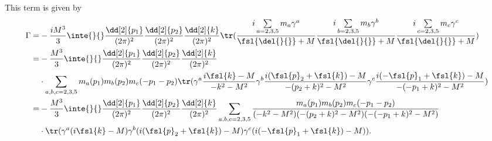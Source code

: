 This term is given by
\begin{align*}
	\Gamma =& -\frac{iM^{3}}{3}\inte{}{}\frac{\dd[2]{p_{1}}}{(2\pi)^{2}}\frac{\dd[2]{p_{2}}}{(2\pi)^{2}}\frac{\dd[2]{k}}{(2\pi)^{2}}\tr(\frac{i\sum\limits_{a = 2, 3, 5}m_{a}\gamma^{a}}{\fsl{\del{}{}} + M}\frac{i\sum\limits_{b = 2, 3, 5}m_{b}\gamma^{b}}{\fsl{\del{}{}} + M}\frac{i\sum\limits_{c = 2, 3, 5}m_{c}\gamma^{c}}{\fsl{\del{}{}} + M}) \\
	       =& -\frac{M^{3}}{3}\inte{}{}\frac{\dd[2]{p_{1}}}{(2\pi)^{2}}\frac{\dd[2]{p_{2}}}{(2\pi)^{2}}\frac{\dd[2]{k}}{(2\pi)^{2}} \\
	        &\cdot\sum\limits_{a, b, c = 2, 3, 5}m_{a}(p_{1})m_{b}(p_{2})m_{c}(-p_{1} - p_{2})\tr(\gamma^{a}\frac{i\fsl{k} - M}{-k^{2} - M^{2}}\gamma^{b}\frac{i(\fsl{p}_{2} + \fsl{k}) - M}{-(p_{2} + k)^{2} - M^{2}}\gamma^{c}\frac{i(-\fsl{p}_{1} + \fsl{k}) - M}{-(-p_{1} + k)^{2} - M^{2}}) \\
	       =& -\frac{M^{3}}{3}\inte{}{}\frac{\dd[2]{p_{1}}}{(2\pi)^{2}}\frac{\dd[2]{p_{2}}}{(2\pi)^{2}}\frac{\dd[2]{k}}{(2\pi)^{2}}\sum\limits_{a, b, c = 2, 3, 5}\frac{m_{a}(p_{1})m_{b}(p_{2})m_{c}(-p_{1} - p_{2})}{(-k^{2} - M^{2})(-(p_{2} + k)^{2} - M^{2})(-(-p_{1} + k)^{2} - M^{2})} \\
	        &\cdot\tr(\gamma^{a}(i\fsl{k} - M)\gamma^{b}(i(\fsl{p}_{2} + \fsl{k}) - M)\gamma^{c}(i(-\fsl{p}_{1} + \fsl{k}) - M)).
\end{align*}

